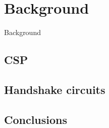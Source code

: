 \chapter{Background}

Background

\section{CSP}

\section{Handshake circuits}





\section{Conclusions}
